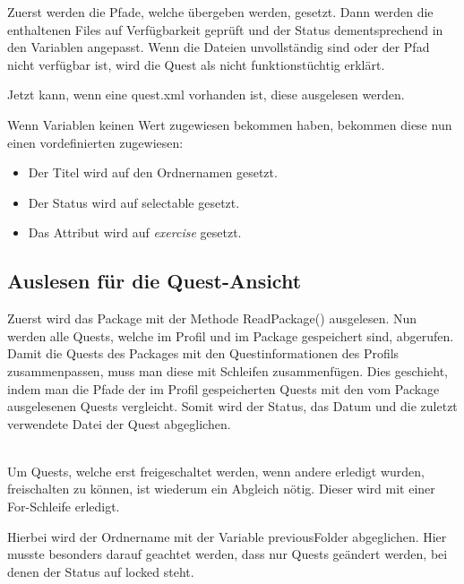 Zuerst werden die Pfade, welche übergeben werden, gesetzt. Dann werden die enthaltenen Files auf Verfügbarkeit geprüft und der Status dementsprechend in den Variablen angepasst. Wenn die Dateien unvollständig sind oder der Pfad nicht verfügbar ist, wird die Quest als nicht funktionstüchtig erklärt.

Jetzt kann, wenn eine quest.xml vorhanden ist, diese ausgelesen werden. 

Wenn Variablen keinen Wert zugewiesen bekommen haben, bekommen diese nun einen vordefinierten zugewiesen:
\begin{itemize}
	\item Der Titel wird auf den Ordnernamen gesetzt.
	\item Der Status wird auf selectable gesetzt.
	\item Das Attribut wird auf \textit{exercise} gesetzt.
\end{itemize}

\subsection{Auslesen für die Quest-Ansicht}
Zuerst wird das Package mit der Methode ReadPackage() ausgelesen. Nun werden alle Quests, welche im Profil und im Package gespeichert sind, abgerufen. Damit die Quests des Packages mit den Questinformationen des Profils zusammenpassen, muss man diese mit Schleifen zusammenfügen. Dies geschieht, indem man die Pfade der im Profil gespeicherten Quests mit den vom Package ausgelesenen Quests vergleicht. Somit wird der Status, das Datum und die zuletzt verwendete Datei der Quest abgeglichen.

\\
Um Quests, welche erst freigeschaltet werden, wenn andere erledigt wurden, freischalten zu können, ist wiederum ein Abgleich nötig. Dieser wird mit einer For-Schleife erledigt. 

Hierbei wird der Ordnername mit der Variable previousFolder abgeglichen. Hier musste besonders darauf geachtet werden, dass nur Quests geändert werden, bei denen der Status auf locked steht.

